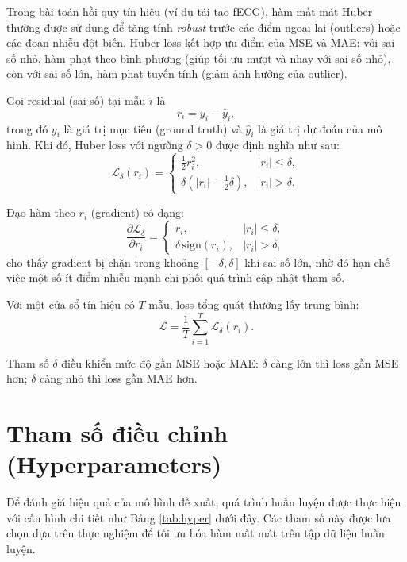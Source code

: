 \documentclass[../DoAn.tex]{subfiles}
\begin{document}
Trong bài toán hồi quy tín hiệu (ví dụ tái tạo fECG), hàm mất mát Huber thường được sử dụng để tăng tính \textit{robust} trước các điểm ngoại lai (outliers) hoặc các đoạn nhiễu đột biến. Huber loss kết hợp ưu điểm của MSE và MAE: với sai số nhỏ, hàm phạt theo bình phương (giúp tối ưu mượt và nhạy với sai số nhỏ), còn với sai số lớn, hàm phạt tuyến tính (giảm ảnh hưởng của outlier).

Gọi residual (sai số) tại mẫu $i$ là
\begin{equation}
  r_i = y_i - \hat{y}_i,
\end{equation}
trong đó $y_i$ là giá trị mục tiêu (ground truth) và $\hat{y}_i$ là giá trị dự đoán của mô hình. Khi đó, Huber loss với ngưỡng $\delta>0$ được định nghĩa như sau:
\begin{equation}
  \mathcal{L}_\delta(r_i)=
  \begin{cases}
    \frac{1}{2}r_i^2, & |r_i|\le \delta,\\[4pt]
    \delta\left(|r_i|-\frac{1}{2}\delta\right), & |r_i|>\delta.
  \end{cases}
\end{equation}

Đạo hàm theo $r_i$ (gradient) có dạng:
\begin{equation}
  \frac{\partial \mathcal{L}_\delta}{\partial r_i}=
  \begin{cases}
    r_i, & |r_i|\le \delta,\\[4pt]
    \delta\,\mathrm{sign}(r_i), & |r_i|>\delta,
  \end{cases}
\end{equation}
cho thấy gradient bị chặn trong khoảng $\left[-\delta,\delta\right]$ khi sai số lớn, nhờ đó hạn chế việc một số ít điểm nhiễu mạnh chi phối quá trình cập nhật tham số.

Với một cửa sổ tín hiệu có $T$ mẫu, loss tổng quát thường lấy trung bình:
\begin{equation}
  \mathcal{L}=\frac{1}{T}\sum_{i=1}^{T}\mathcal{L}_\delta(r_i).
\end{equation}

Tham số $\delta$ điều khiển mức độ gần MSE hoặc MAE: $\delta$ càng lớn thì loss gần MSE hơn; $\delta$ càng nhỏ thì loss gần MAE hơn.

\section{Tham số điều chỉnh (Hyperparameters)}

Để đánh giá hiệu quả của mô hình đề xuất, quá trình huấn luyện được thực hiện với cấu hình chi tiết như Bảng \ref{tab:hyper} dưới đây. Các tham số này được lựa chọn dựa trên thực nghiệm để tối ưu hóa hàm mất mát trên tập dữ liệu huấn luyện.
\end{document}

